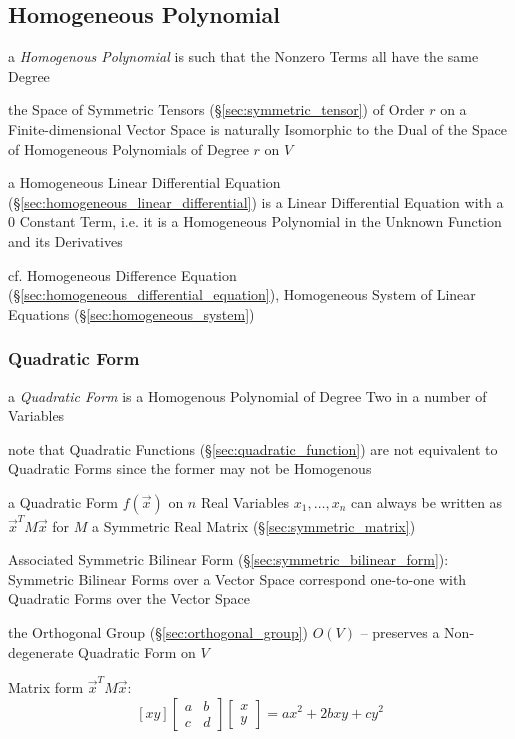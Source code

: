 \subsection{Homogeneous Polynomial}\label{sec:homogeneous_polynomial}

a \emph{Homogenous Polynomial} is such that the Nonzero Terms all have the same
Degree

the Space of Symmetric Tensors (\S\ref{sec:symmetric_tensor}) of Order $r$ on a
Finite-dimensional Vector Space is naturally Isomorphic to the Dual of the
Space of Homogeneous Polynomials of Degree $r$ on $V$

a Homogeneous Linear Differential Equation
(\S\ref{sec:homogeneous_linear_differential}) is a Linear Differential
Equation with a $0$ Constant Term, i.e. it is a Homogeneous Polynomial in the
Unknown Function and its Derivatives

cf. Homogeneous Difference Equation
(\S\ref{sec:homogeneous_differential_equation}),
Homogeneous System of Linear Equations (\S\ref{sec:homogeneous_system})



\subsubsection{Quadratic Form}\label{sec:quadratic_form}

a \emph{Quadratic Form} is a Homogenous Polynomial of Degree Two in a number of
Variables

note that Quadratic Functions (\S\ref{sec:quadratic_function}) are not
equivalent to Quadratic Forms since the former may not be Homogenous

a Quadratic Form $f(\vec{x})$ on $n$ Real Variables $x_1,\ldots,x_n$ can always
be written as $\vec{x}^T M \vec{x}$ for $M$ a Symmetric Real Matrix
(\S\ref{sec:symmetric_matrix})

Associated Symmetric Bilinear Form (\S\ref{sec:symmetric_bilinear_form}):
Symmetric Bilinear Forms over a Vector Space correspond one-to-one with
Quadratic Forms over the Vector Space

the Orthogonal Group (\S\ref{sec:orthogonal_group}) $O(V)$ -- preserves a
Non-degenerate Quadratic Form on $V$

Matrix form $\vec{x}^T M \vec{x}$:
\[
  [x y]
  \begin{bmatrix}
    a & b \\
    c & d
  \end{bmatrix}
  \begin{bmatrix}
    x \\
    y
  \end{bmatrix}
  = ax^2 + 2bxy + cy^2
\]



